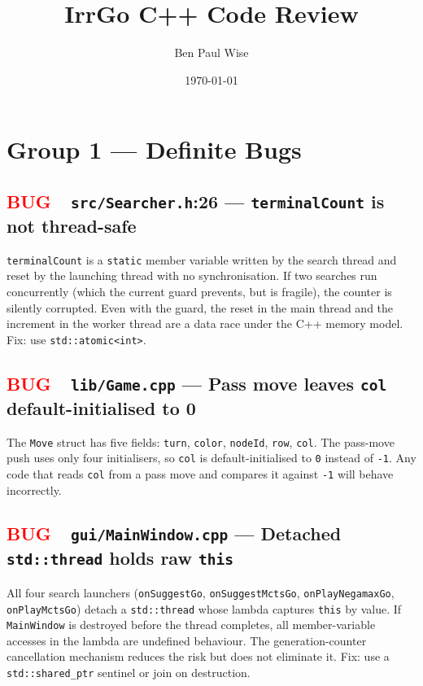 \documentclass[11pt,letterpaper]{article}
\title{\textbf{IrrGo C++ Code Review}}
\author{Ben Paul Wise}
\date{\today}
\newcommand{\file}[1]{\texttt{#1}}
\newcommand{\code}[1]{\texttt{#1}}
\newcommand{\bug}{\textcolor{red}{\textbf{BUG}}}
\begin{document}
\maketitle
\tableofcontents
\newpage

\section{Group 1 — Definite Bugs}

\subsection{\bug\ \ \file{src/Searcher.h}:26 — \code{terminalCount} is not thread-safe}

\code{terminalCount} is a \code{static} member variable written by the search
thread and reset by the launching thread with no synchronisation.  If two
searches run concurrently (which the current guard prevents, but is fragile),
the counter is silently corrupted.  Even with the guard, the reset in the
main thread and the increment in the worker thread are a data race under the
C++ memory model.  Fix: use \code{std::atomic<int>}.

\subsection{\bug\ \ \file{lib/Game.cpp} — Pass move leaves \code{col} default-initialised to 0}

The \code{Move} struct has five fields: \code{turn}, \code{color},
\code{nodeId}, \code{row}, \code{col}.  The pass-move push uses only four
initialisers, so \code{col} is default-initialised to \code{0} instead of
\code{-1}.  Any code that reads \code{col} from a pass move and compares it
against \code{-1} will behave incorrectly.

\subsection{\bug\ \ \file{gui/MainWindow.cpp} — Detached \code{std::thread} holds raw \code{this}}

All four search launchers (\code{onSuggestGo}, \code{onSuggestMctsGo},
\code{onPlayNegamaxGo}, \code{onPlayMctsGo}) detach a \code{std::thread}
whose lambda captures \code{this} by value.  If \code{MainWindow} is
destroyed before the thread completes, all member-variable accesses in the
lambda are undefined behaviour.  The generation-counter cancellation
mechanism reduces the risk but does not eliminate it.  Fix: use a
\code{std::shared\_ptr} sentinel or join on destruction.
\end{document}
